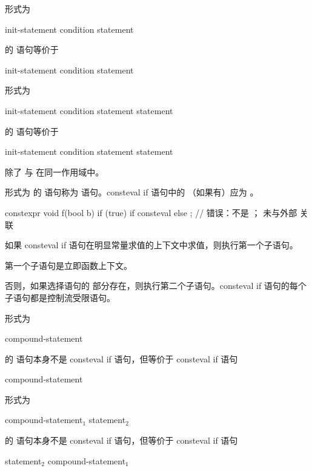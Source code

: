 \pnum
形式为
\begin{ncsimplebnf}
  \terminal{(} init-statement condition \terminal{)} statement
\end{ncsimplebnf}
的  语句等价于
\begin{ncsimplebnf}
\terminal{\{}\br
\bnfindent init-statement\br
\bnfindent {}  \terminal{(} condition \terminal{)} statement\br
\terminal{\}}
\end{ncsimplebnf}
形式为
\begin{ncsimplebnf}
  \terminal{(} init-statement condition \terminal{)} statement  statement
\end{ncsimplebnf}
的  语句等价于
\begin{ncsimplebnf}
\terminal{\{}\br
\bnfindent init-statement\br
\bnfindent {}  \terminal{(} condition \terminal{)} statement  statement\br
\terminal{\}}
\end{ncsimplebnf}
除了  与  在同一作用域中。

\pnum
形式为  的  语句称为  语句。consteval if 语句中的 （如果有）应为 。
\begin{example}
\begin{codeblock}
constexpr void f(bool b) {
  if (true)
    if consteval { }
    else ;              // 错误：不是 ； 未与外部  关联
}
\end{codeblock}
\end{example}

\pnum
如果 consteval if 语句在明显常量求值的上下文中求值，则执行第一个子语句。
\begin{note}
第一个子语句是立即函数上下文。
\end{note}
否则，如果选择语句的  部分存在，则执行第二个子语句。consteval if 语句的每个子语句都是控制流受限语句。

\pnum
形式为
\begin{ncsimplebnf}
 \terminal{!}  compound-statement
\end{ncsimplebnf}
的  语句本身不是 consteval if 语句，但等价于 consteval if 语句
\begin{ncsimplebnf}
  \terminal{\{} \terminal{\}}  compound-statement
\end{ncsimplebnf}
形式为
\begin{ncsimplebnf}
 \terminal{!}  compound-statement$_1$  statement$_2$
\end{ncsimplebnf}
的  语句本身不是 consteval if 语句，但等价于 consteval if 语句
\begin{ncsimplebnf}
  statement$_2$  compound-statement$_1$
\end{ncsimplebnf}

